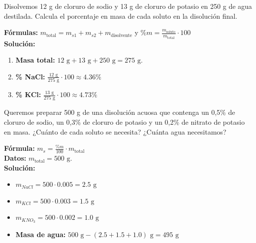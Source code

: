 \begin{exercise}
    Disolvemos 12 g de cloruro de sodio y 13 g de cloruro de potasio en 250 g de agua destilada. Calcula el porcentaje en masa de cada soluto en la disolución final.
    \begin{solu}
        \textbf{Fórmulas:} $m_{\text{total}} = m_{s1} + m_{s2} + m_{\text{disolvente}}$ y $\%m = \frac{m_{\text{soluto}}}{m_{\text{total}}} \cdot 100$ \\
        \textbf{Solución:}
        \begin{enumerate}
            \item \textbf{Masa total:} $12 \text{ g} + 13 \text{ g} + 250 \text{ g} = 275 \text{ g}$.
            \item \textbf{\% NaCl:} $\frac{12 \text{ g}}{275 \text{ g}} \cdot 100 \approx 4.36\%$
            \item \textbf{\% KCl:} $\frac{13 \text{ g}}{275 \text{ g}} \cdot 100 \approx 4.73\%$
        \end{enumerate}
    \end{solu}
\end{exercise}

\begin{exercise}
    Queremos preparar 500 g de una disolución acuosa que contenga un 0,5\% de cloruro de sodio, un 0,3\% de cloruro de potasio y un 0,2\% de nitrato de potasio en masa. ¿Cuánto de cada soluto se necesita? ¿Cuánta agua necesitamos?
    \begin{solu}
        \textbf{Fórmula:} $m_s = \frac{\%m}{100} \cdot m_{\text{total}}$ \\

        \textbf{Datos:} $m_{\text{total}} = 500 \text{ g}$. \\

        \textbf{Solución:}
        \begin{itemize}
            \item $m_{NaCl} = 500 \cdot 0.005 = 2.5 \text{ g}$
            \item $m_{KCl} = 500 \cdot 0.003 = 1.5 \text{ g}$
            \item $m_{KNO_3} = 500 \cdot 0.002 = 1.0 \text{ g}$
            \item \textbf{Masa de agua:} $500 \text{ g} - (2.5 + 1.5 + 1.0) \text{ g} = 495 \text{ g}$
        \end{itemize}
    \end{solu}
\end{exercise}

